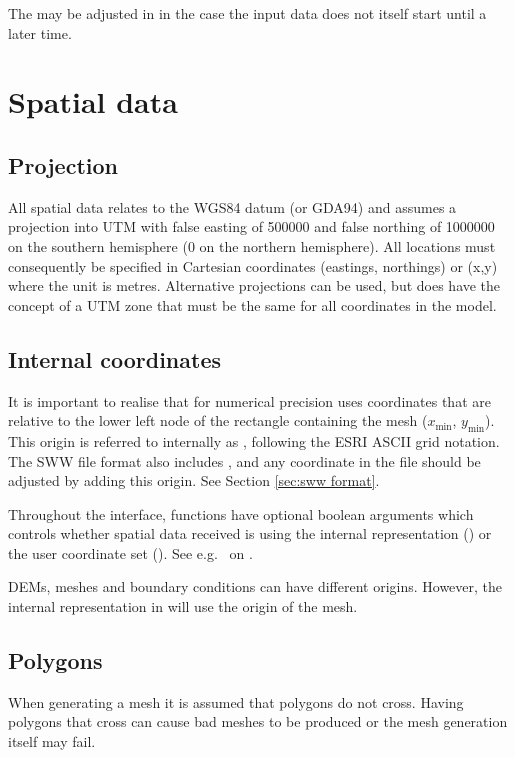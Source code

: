 \documentclass{manual}
\begin{document}
The  may be adjusted in  in the case the
input data does not itself start until a later time.


\section{Spatial data}

\subsection{Projection}
All spatial data relates to the WGS84 datum (or GDA94) and assumes a projection
into UTM with false easting of 500000 and false northing of
1000000 on the southern hemisphere (0 on the northern hemisphere).
All locations must consequently be specified in Cartesian coordinates
(eastings, northings) or (x,y) where the unit is metres.
Alternative projections can be used, but \anuga does have the concept of a UTM zone
that must be the same for all coordinates in the model.

\subsection{Internal coordinates}
It is important to realise that for numerical precision \anuga uses coordinates that are relative
to the lower left node of the rectangle containing the mesh ($x_{\mbox{min}}$, $y_{\mbox{min}}$).
This origin is referred to internally as ,  following the ESRI ASCII grid notation.
The SWW file format also includes ,  and any coordinate in the file should be adjusted
by adding this origin. See Section \ref{sec:sww format}.

Throughout the \anuga interface, functions have optional boolean arguments  which controls
whether spatial data received is using the internal representation () or the
user coordinate set (). See e.g.\  on \pageref{pg:get vertex coordinates}.

DEMs, meshes and boundary conditions can have different origins. However, the internal representation in \anuga
will use the origin of the mesh.

\subsection{Polygons}
When generating a mesh it is assumed that polygons do not cross.
Having polygons that cross can cause bad meshes to be produced or the mesh generation itself may fail.
\end{document}
